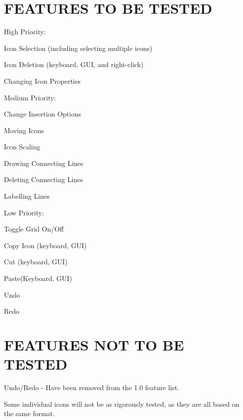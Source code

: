\documentclass[twoside,letterpaper]{article}
\begin{document}
\section[FEATURES TO BE TESTED]{\bfseries\color{black} FEATURES TO BE TESTED}
{\color{black}
\begin{list}{-}{ }
\item High Priority:
\begin{list}{-}{ }
\item Icon Selection (including selecting multiple icons)
\item Icon Deletion (keyboard, GUI, and right-click)
\item Changing Icon Properties
\end{list}
\item Medium Priority:
\begin{list}{-}{ }
\item Change Insertion Options
\item Moving Icons
\item Icon Scaling
\item Drawing Connecting Lines
\item Deleting Connecting Lines
\item Labelling Lines
\end{list}
\item Low Priority:
\begin{list}{-}{ }
\item Toggle Grid On/Off
\item Copy Icon (keyboard, GUI)
\item Cut (keyboard, GUI)
\item Paste(Keyboard, GUI)
\item Undo
\item Redo
\end{list}
\end{list}
}

\section[FEATURES NOT TO BE TESTED]{\bfseries\color{black}
	 FEATURES NOT TO BE TESTED}
{\color{black}
\begin{list}{-}{ }
\item Undo/Redo - Have been removed from the 1.0 feature list.
\item Some individual icons will not be as rigorously tested, as they are all based on the same format.
\end{list}
}
\end{document}
